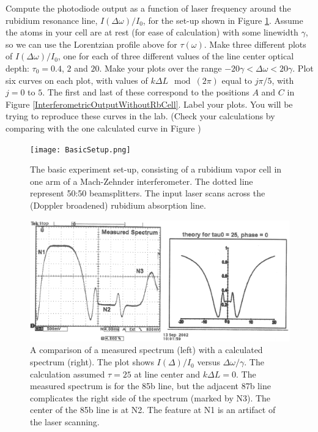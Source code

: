 \documentclass{assignment}
\begin{document}
\begin{prob}
    Compute the photodiode output as a function of laser frequency around the rubidium resonance line, $I(\Delta\omega)/I_0$, for the set-up shown in Figure \ref{BasicSetup}. Assume the atoms in your cell are at rest (for ease of calculation) with some linewidth $\gamma$, so we can use the Lorentzian profile above for $\tau(\omega)$. Make three different plots of $I(\Delta\omega)/I_0$, one for each of three different values of the line center optical depth: $\tau_0=0.4$, $2$ and $20$. Make your plots over the range $-20\gamma<\Delta\omega<20\gamma$. Plot six curves on each plot, with values of $k\Delta L\mod(2\pi)$ equal to $j\pi/5$, with $j=0$ to $5$. The first and last of these correspond to the positions $A$ and $C$ in Figure \ref{InterferometricOutputWithoutRbCell}. Label your plots. You will be trying to reproduce these curves in the lab. (Check your calculations by comparing with the one calculated curve in Figure )
    \begin{figure}[h]
        \centering
        \texttt{[image: BasicSetup.png]}
        \caption{The basic experiment set-up, consisting of a rubidium vapor cell in one arm of a Mach-Zehnder interferometer. The dotted line represent 50:50 beamsplitters. The input laser scans across the (Doppler broadened) rubidium absorption line.}
        \label{BasicSetup}
    \end{figure}
    \begin{figure}[h]
        \centering
        \includegraphics[width=.5\textwidth]{ComparisonOfMeasuredAndCalculatedSpectrum.png}
        \caption{A comparison of a measured spectrum (left) with a calculated spectrum (right). The plot shows $I(\Delta)/I_0$ versus $\Delta\omega/\gamma$. The calculation assumed $\tau=25$ at line center and $k\Delta L=0$. The measured spectrum is for the 85b line, but the adjacent 87b line complicates the right side of the spectrum (marked by N3). The center of the 85b line is at N2. The feature at N1 is an artifact of the laser scanning.}
    \end{figure}
\end{prob}
\end{document}
